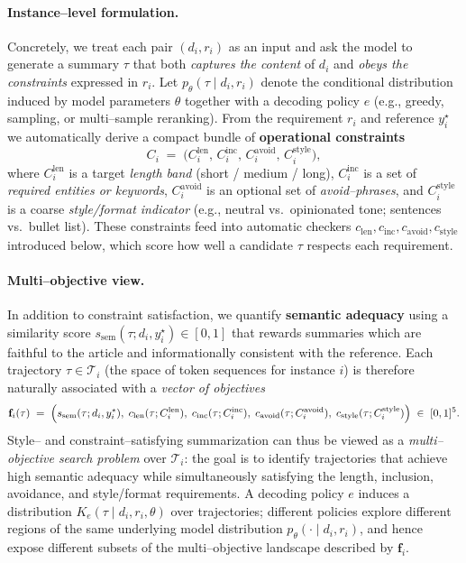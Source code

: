 \paragraph{Instance--level formulation.}
Concretely, we treat each pair $(d_i, r_i)$ as an input and ask the
model to generate a summary $\tau$ that both \emph{captures the
content} of $d_i$ and \emph{obeys the constraints} expressed in $r_i$.
Let $p_\theta(\tau \mid d_i, r_i)$ denote the conditional distribution
induced by model parameters $\theta$ together with a decoding policy $e$
(e.g., greedy, sampling, or multi--sample reranking). From the
requirement $r_i$ and reference $y_i^\star$ we automatically derive a
compact bundle of \textbf{operational constraints}
\[
  C_i \;=\;
  \bigl(
    C^{\text{len}}_i,\,
    C^{\text{inc}}_i,\,
    C^{\text{avoid}}_i,\,
    C^{\text{style}}_i
  \bigr),
\]
where $C^{\text{len}}_i$ is a target \emph{length band} (short / medium
/ long), $C^{\text{inc}}_i$ is a set of \emph{required entities or
keywords}, $C^{\text{avoid}}_i$ is an optional set of
\emph{avoid--phrases}, and $C^{\text{style}}_i$ is a coarse
\emph{style/format indicator} (e.g., neutral vs.\ opinionated tone;
sentences vs.\ bullet list). These constraints feed into automatic
checkers
$c_{\text{len}}, c_{\text{inc}}, c_{\text{avoid}}, c_{\text{style}}$
introduced below, which score how well a candidate $\tau$ respects each
requirement.

\paragraph{Multi--objective view.}
In addition to constraint satisfaction, we quantify \textbf{semantic
adequacy} using a similarity score $s_{\text{sem}}(\tau; d_i, y_i^\star)
\in [0,1]$ that rewards summaries which are faithful to the article and
informationally consistent with the reference. Each trajectory
$\tau \in \mathcal{T}_i$ (the space of token sequences for instance $i$)
is therefore naturally associated with a \emph{vector of objectives}
\[
  \mathbf{f}_i(\tau)
  \;=\;
  \Bigl(
    s_{\text{sem}}(\tau; d_i, y_i^\star),\;
    c_{\text{len}}(\tau; C^{\text{len}}_i),\;
    c_{\text{inc}}(\tau; C^{\text{inc}}_i),\;
    c_{\text{avoid}}(\tau; C^{\text{avoid}}_i),\;
    c_{\text{style}}(\tau; C^{\text{style}}_i)
  \Bigr)
  \;\in\; [0,1]^5.
\]
Style-- and constraint--satisfying summarization can thus be viewed as a
\emph{multi--objective search problem} over $\mathcal{T}_i$: the goal is
to identify trajectories that achieve high semantic adequacy while
simultaneously satisfying the length, inclusion, avoidance, and
style/format requirements. A decoding policy $e$ induces a distribution
$K_e(\tau \mid d_i, r_i, \theta)$ over trajectories; different policies
explore different regions of the same underlying model distribution
$p_\theta(\cdot \mid d_i, r_i)$, and hence expose different subsets of
the multi--objective landscape described by $\mathbf{f}_i$.

